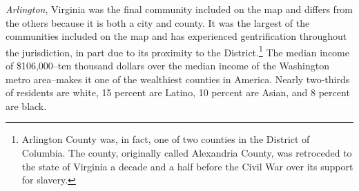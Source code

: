 \documentclass[11pt]{baderart}
\begin{document}
\emph{Arlington}, Virginia was the final community included on the map and differs from the others because it is both a city and county. It was the largest of the communities included on the map and has experienced gentrification throughout the jurisdiction, in part due to its proximity to the District.\footnote{Arlington County was, in fact, one of two counties in the District of Columbia. The county, originally called Alexandria County, was retroceded to the state of Virginia a decade and a half before the Civil War over its support for slavery.} The median income of \$106,000--ten thousand dollars over the median income of the Washington metro area--makes it one of the wealthiest counties in America. Nearly two-thirds of residents are white, 15 percent are Latino, 10 percent are Asian, and 8 percent are black. 




\end{document}
